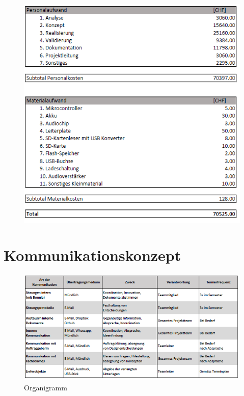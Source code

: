 \documentclass[10pt,a4paper,oneside]{99_fhnwreport}
\begin{document}
\begin{figure}[htbp]
	\centering
	\includegraphics[width=13.5cm]{Projektbudget.png}
\end{figure}
\newpage
\section{Kommunikationskonzept \label{sec:kommunikationskonzept}}

\begin{figure}[htbp]
	\centering
	\includegraphics[width=13.5cm]{Kommunikationskonzept.png}
		\caption{Organigramm}
\end{figure}
\end{document}
